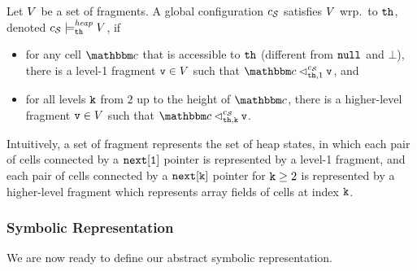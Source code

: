 Let $V$ be a set of fragments.
A global configuration $c_{\mathcal S}$ satisfies $V$
wrp.\ to ${\tt th}$, denoted  $c_{\mathcal S} \models_{{\tt th}}^{\mathit{heap}} V$, if
\begin{itemize}
  \item for any cell $\cell$ that is accessible to ${\tt th}$ (different from ${\tt null}$ and $\bot$), there is a level-1 fragment
$\mathtt{v} \in V$ such that $\cell \lsatfrag{1}{{\thread}}{\sconf} \frag$,
    and
  \item
    for all levels ${\tt k}$ from $2$ up to the height of $\cell$, 
there is a higher-level fragment
$\mathtt{v} \in V$ such that $\cell \lsatfrag{\klevel}{{\thread}}{\sconf} \frag$.
\end{itemize}
Intuitively, a set of fragment represents the set of heap states, in which
each  pair of cells connected by a $\tt next[1]$ pointer is represented
by a level-1 fragment, and each pair of cells connected by a $\tt next[k]$
pointer for ${\tt k} \geq 2$ is represented by a higher-level fragment which 
represents array fields of cells at index ${\tt k}$.

\subsubsection{Symbolic Representation}
We are now ready to define our abstract symbolic representation.

